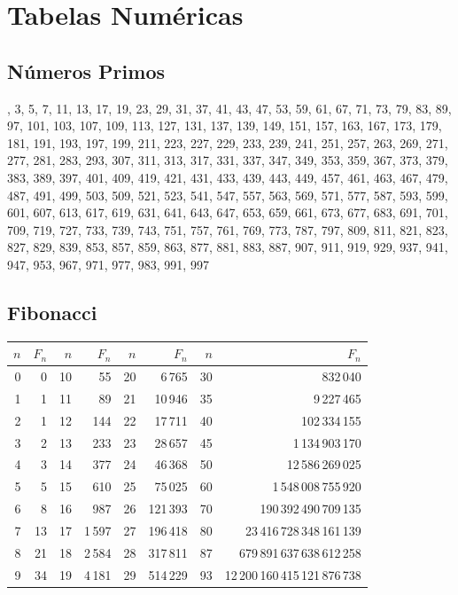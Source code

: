 \setlength{\parindent}{0pt}
\section{Tabelas Numéricas}

\subsection{Números Primos}

{\fontsize{6}{7}\selectfont
{}, 3, 5, 7, 11, 13, 17, 19, 23, 29, 31, 37, 41, 43, 47, 53, 59, 61, 67, 71,
73, 79, 83, 89, 97, 101, 103, 107, 109, 113, 127, 131, 137, 139, 149, 151, 157, 163, 167, 173,
179, 181, 191, 193, 197, 199, 211, 223, 227, 229, 233, 239, 241, 251, 257, 263, 269, 271, 277, 281,
283, 293, 307, 311, 313, 317, 331, 337, 347, 349, 353, 359, 367, 373, 379, 383, 389, 397, 401, 409,
419, 421, 431, 433, 439, 443, 449, 457, 461, 463, 467, 479, 487, 491, 499, 503, 509, 521, 523, 541,
547, 557, 563, 569, 571, 577, 587, 593, 599, 601, 607, 613, 617, 619, 631, 641, 643, 647, 653, 659,
661, 673, 677, 683, 691, 701, 709, 719, 727, 733, 739, 743, 751, 757, 761, 769, 773, 787, 797, 809,
811, 821, 823, 827, 829, 839, 853, 857, 859, 863, 877, 881, 883, 887, 907, 911, 919, 929, 937, 941,
947, 953, 967, 971, 977, 983, 991, 997
}

\subsection{Fibonacci}

{\fontsize{7}{9}\selectfont
\setlength{\tabcolsep}{3pt}
\noindent\begin{tabular}{rr|rr|rr|rr}
$n$ & $F_n$ & $n$ & $F_n$ & $n$ & $F_n$ & $n$ & $F_n$ \\
\hline
0 & 0 & 10 & 55 & 20 & 6\,765 & 30 & 832\,040 \\
1 & 1 & 11 & 89 & 21 & 10\,946 & 35 & 9\,227\,465 \\
2 & 1 & 12 & 144 & 22 & 17\,711 & 40 & 102\,334\,155 \\
3 & 2 & 13 & 233 & 23 & 28\,657 & 45 & 1\,134\,903\,170 \\
4 & 3 & 14 & 377 & 24 & 46\,368 & 50 & 12\,586\,269\,025 \\
5 & 5 & 15 & 610 & 25 & 75\,025 & 60 & 1\,548\,008\,755\,920 \\
6 & 8 & 16 & 987 & 26 & 121\,393 & 70 & 190\,392\,490\,709\,135 \\
7 & 13 & 17 & 1\,597 & 27 & 196\,418 & 80 & 23\,416\,728\,348\,161\,139 \\
8 & 21 & 18 & 2\,584 & 28 & 317\,811 & 87 & 679\,891\,637\,638\,612\,258 \\
9 & 34 & 19 & 4\,181 & 29 & 514\,229 & 93 & 12\,200\,160\,415\,121\,876\,738 \\
\end{tabular}
}


